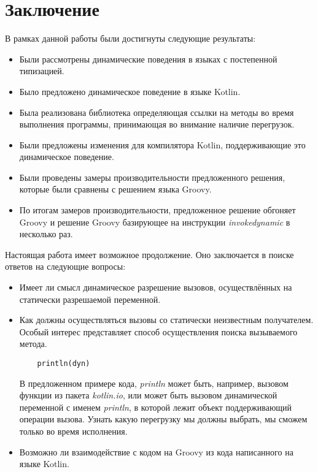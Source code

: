 \vfill
\clearpage
\section*{Заключение}



В рамках данной работы были достигнуты следующие результаты:

\begin{itemize}
    \item Были рассмотрены динамические поведения в языках с постепенной типизацией.
    \item Было предложено динамическое поведение в языке Kotlin.
    \item Была реализована библиотека определяющая ссылки на методы во время выполнения программы, принимающая во внимание наличие перегрузок.
    \item Были предложены изменения для компилятора Kotlin, поддерживающие это динамическое поведение.
    \item Были проведены замеры производительности предложенного решения, которые были сравнены с решением языка Groovy.
        \item По итогам замеров производительности, предложенное решение обгоняет Groovy и решение Groovy базирующее на инструкции \textit{invokedynamic} в несколько раз.
\end{itemize}

Настоящая работа имеет возможное продолжение. Оно заключается в поиске ответов на следующие вопросы:

\begin{itemize}
    \item Имеет ли смысл динамическое разрешение вызовов, осуществлённых на статически разрешаемой переменной.
    \item Как должны осуществляться вызовы со статически неизвестным получателем. Особый интерес представляет способ осуществления поиска вызываемого метода. 
    \begin{verbatim}
    println(dyn)
\end{verbatim}
В предложенном примере кода, \textit{println} может быть, например, вызовом функции из пакета \textit{kotlin.io}, или может быть вызовом динамической переменной с именем \textit{println}, в которой лежит объект поддерживающий операции вызова. Узнать какую перегрузку мы должны выбрать, мы сможем только во время исполнения.
    \item Возможно ли взаимодействие с кодом на Groovy из кода написанного на языке Kotlin.
\end{itemize}
